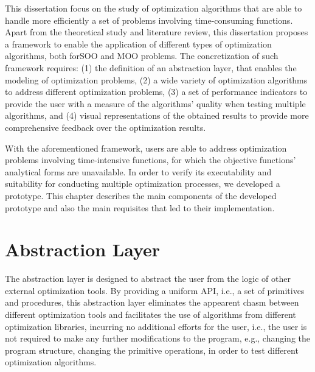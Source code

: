 \cleardoublepage
\label{chap:architecture}

This dissertation focus on the study of optimization algorithms that are able to handle more efficiently a set of problems involving time-consuming functions. Apart from the theoretical study and literature review, this dissertation proposes a framework to enable the application of different types of optimization algorithms, both for\ac{SOO} and \ac{MOO} problems. The concretization of such framework requires: (1) the definition of an abstraction layer, that enables the modeling of optimization problems, (2) a wide variety of optimization algorithms to address different optimization problems, (3) a set of performance indicators to provide the user with a measure of the algorithms' quality when testing multiple algorithms, and (4) visual representations of the obtained results to provide more comprehensive feedback over the optimization results.   

With the aforementioned framework, users are able to address optimization problems involving time-intensive functions, for which the objective functions' analytical forms are unavailable. In order to verify its executability and suitability for conducting multiple optimization processes, we developed a prototype. This chapter describes the main components of the developed prototype and also the main requisites that led to their implementation. 

\section{Abstraction Layer}

The abstraction layer is designed to abstract the user from the logic of other external optimization tools. By providing a uniform \ac{API}, i.e., a set of primitives and procedures, this abstraction layer eliminates the appearent chasm between different optimization tools and facilitates the use of algorithms from different optimization libraries, incurring no additional efforts for the user, i.e., the user is not required to make any further modifications to the program, e.g., changing the program structure, changing the primitive operations, in order to test different optimization algorithms. 

